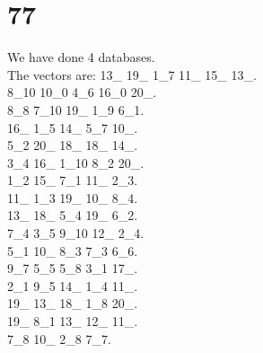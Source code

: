 \chapter{77}
\indent We have done 4 databases.\\
The vectors are:
13\_ 19\_ 1\_7 11\_ 15\_ 13\_.\\8\_10 10\_0 4\_6 16\_0 20\_.\\8\_8 7\_10 19\_ 1\_9 6\_1.\\16\_ 1\_5 14\_ 5\_7 10\_.\\5\_2 20\_ 18\_ 18\_ 14\_.\\3\_4 16\_ 1\_10 8\_2 20\_.\\1\_2 15\_ 7\_1 11\_ 2\_3.\\11\_ 1\_3 19\_ 10\_ 8\_4.\\13\_ 18\_ 5\_4 19\_ 6\_2.\\7\_4 3\_5 9\_10 12\_ 2\_4.\\5\_1 10\_ 8\_3 7\_3 6\_6.\\9\_7 5\_5 5\_8 3\_1 17\_.\\2\_1 9\_5 14\_ 1\_4 11\_.\\19\_ 13\_ 18\_ 1\_8 20\_.\\19\_ 8\_1 13\_ 12\_ 11\_.\\7\_8 10\_ 2\_8 7\_7.\\